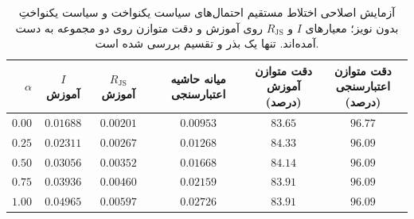 \begin{table}[htbp]
\centering\small
\caption{آزمایش اصلاحی اختلاط مستقیم احتمال‌های سیاست یکنواخت و سیاست یکنواختِ بدون نویز؛ معیارهای $I$ و $R_{\mathrm{JS}}$ روی آموزش و دقت متوازن روی دو مجموعه به دست آمده‌اند. تنها یک بذر و تقسیم بررسی شده است.}
\label{tab:ch4-guided-probability-mixture}
\begin{tabular}{rccccc}\hline
$\alpha$ & $I$ آموزش & $R_{\mathrm{JS}}$ آموزش & میانه حاشیه اعتبارسنجی & \shortstack{دقت متوازن\\آموزش (درصد)} & \shortstack{دقت متوازن\\اعتبارسنجی (درصد)}\\\hline
$0.00$ & $0.01688$ & $0.00201$ & $0.00953$ & $83.65$ & $96.77$ \\
$0.25$ & $0.02311$ & $0.00267$ & $0.01268$ & $84.33$ & $96.09$ \\
$0.50$ & $0.03056$ & $0.00352$ & $0.01668$ & $84.14$ & $96.09$ \\
$0.75$ & $0.03936$ & $0.00460$ & $0.02159$ & $83.91$ & $96.09$ \\
$1.00$ & $0.04965$ & $0.00597$ & $0.02726$ & $83.91$ & $96.09$ \\
\hline
\end{tabular}
\end{table}
